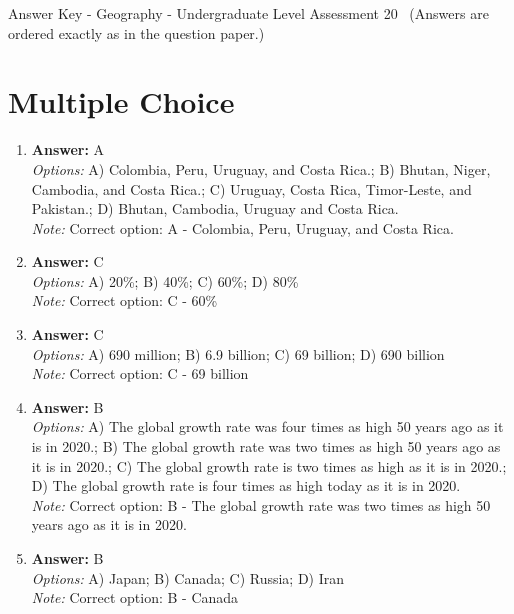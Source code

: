 \documentclass[12pt]{article}
\begin{document}
\begin{center}
Answer Key - Geography - Undergraduate Level Assessment 20 \
\small (Answers are ordered exactly as in the question paper.)
\end{center}

\section*{Multiple Choice}
\begin{enumerate}[label=\arabic*.]
\item \textbf{Answer:} A
\\ \textit{Options:} A) Colombia, Peru, Uruguay, and Costa Rica.; B) Bhutan, Niger, Cambodia, and Costa Rica.; C) Uruguay, Costa Rica, Timor-Leste, and Pakistan.; D) Bhutan, Cambodia, Uruguay and Costa Rica.
\\ \textit{Note:} Correct option: A - Colombia, Peru, Uruguay, and Costa Rica.
\item \textbf{Answer:} C
\\ \textit{Options:} A) 20\%; B) 40\%; C) 60\%; D) 80\%
\\ \textit{Note:} Correct option: C - 60\%
\item \textbf{Answer:} C
\\ \textit{Options:} A) 690 million; B) 6.9 billion; C) 69 billion; D) 690 billion
\\ \textit{Note:} Correct option: C - 69 billion
\item \textbf{Answer:} B
\\ \textit{Options:} A) The global growth rate was four times as high 50 years ago as it is in 2020.; B) The global growth rate was two times as high 50 years ago as it is in 2020.; C) The global growth rate is two times as high as it is in 2020.; D) The global growth rate is four times as high today as it is in 2020.
\\ \textit{Note:} Correct option: B - The global growth rate was two times as high 50 years ago as it is in 2020.
\item \textbf{Answer:} B
\\ \textit{Options:} A) Japan; B) Canada; C) Russia; D) Iran
\\ \textit{Note:} Correct option: B - Canada
\end{enumerate}
\end{document}
